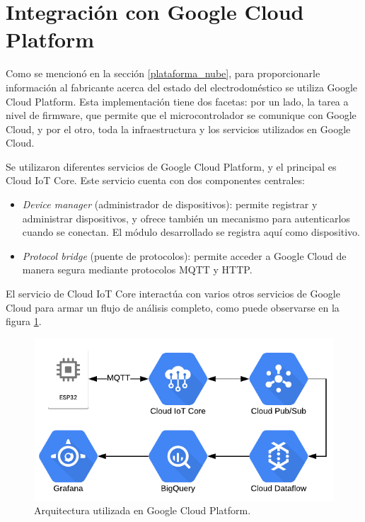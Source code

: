 \section{Integración con Google Cloud Platform}
\label{sec:google_cloud}

Como se mencionó en la sección \ref{plataforma_nube}, para proporcionarle información al fabricante acerca del estado del electrodoméstico se utiliza Google Cloud Platform. Esta implementación tiene dos facetas: por un lado, la tarea a nivel de firmware, que permite que el microcontrolador se comunique con Google Cloud, y por el otro, toda la infraestructura y los servicios utilizados en Google Cloud.

Se utilizaron diferentes servicios de Google Cloud Platform, y el principal es Cloud IoT Core. Este servicio cuenta con dos componentes centrales:

\begin{itemize}
	\item \emph{Device manager} (administrador de dispositivos): permite registrar y administrar dispositivos, y ofrece también un mecanismo para autenticarlos cuando se conectan. El módulo desarrollado se registra aquí como dispositivo.
	\item \emph{Protocol bridge} (puente de protocolos): permite acceder a Google Cloud de manera segura mediante protocolos MQTT y HTTP.
\end{itemize}

El servicio de Cloud IoT Core interactúa con varios otros servicios de Google Cloud para armar un flujo de análisis completo, como puede observarse en la figura \ref{fig:google_cloud_diagram}.

\begin{figure}[h]
\centering
\includegraphics[width=\textwidth]{./Figures/google_cloud_diagram.pdf}
\caption{Arquitectura utilizada en Google Cloud Platform.}
\label{fig:google_cloud_diagram}
\end{figure}

